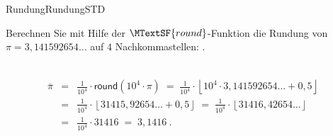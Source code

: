\begin{MXContent}{Rundung}{Rundung}{STD}
\begin{MExercise}
Berechnen Sie mit Hilfe der $\MTextSF{round}$-Funktion die Rundung von $\pi=3,141592654\ldots$ auf $4$ Nachkommastellen:
.
\ \\ \ \\
\begin{MHint}{\iSolution}
\begin{eqnarray*}
\overline{\pi} & = & \frac{1}{10^{4}}\cdot \mathsf{round}(10^{4}\cdot \pi)\; =\; \frac{1}{10^{4}}\cdot \left\lfloor{ 10^{4}\cdot 3,141592654\ldots + 0,5 }\right\rfloor \ \\
& = & \frac{1}{10^{4}}\cdot \left\lfloor{ 31415,92654\ldots+0,5}\right\rfloor \;=\; \frac{1}{10^{4}}\cdot \left\lfloor{ 31416,42654\ldots }\right\rfloor\ \\
& = & \frac{1}{10^{4}}\cdot 31416\; =\;  3,1416\: .
\end{eqnarray*}
\end{MHint}
\end{MExercise}


\end{MXContent}
